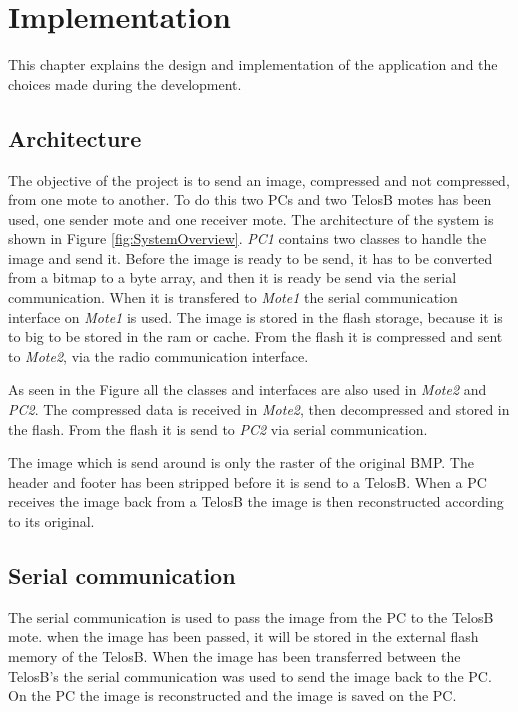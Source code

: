 \chapter{Implementation}
\label{chp:impl}

This chapter explains the design and implementation of the application and the choices made during the development.

\section{Architecture}
The objective of the project is to send an image, compressed and not compressed, from one mote to another. To do this two PCs and two TelosB motes has been used, one sender mote and one receiver mote. The architecture of the system is shown in Figure \ref{fig:SystemOverview}. \emph{PC1} contains two classes to handle the image and send it. Before the image is ready to be send, it has to be converted from a bitmap to a byte array, and then it is ready be send via the serial communication. When it is transfered to \emph{Mote1} the serial communication interface on \emph{Mote1} is used. The image is stored in the flash storage, because it is to big to be stored in the ram or cache. From the flash it is compressed and sent to \emph{Mote2}, via the radio communication interface.


As seen in the Figure all the classes and interfaces are also used in \emph{Mote2} and \emph{PC2}. The compressed data is received in \emph{Mote2}, then decompressed and stored in the flash. From the flash it is send to \emph{PC2} via serial communication. 

The image which is send around is only the raster of the original BMP. The header and footer has been stripped before it is send to a TelosB. When a PC receives the image back from a TelosB the image is then reconstructed according to its original.

\section{Serial communication}
The serial communication is used to pass the image from the PC to the TelosB mote. when the image has been passed, it will be stored in the external flash memory of the TelosB. When the image has been transferred between the TelosB's the serial communication was used to send the image back to the PC. On the PC the image is reconstructed and the image is saved on the PC.

